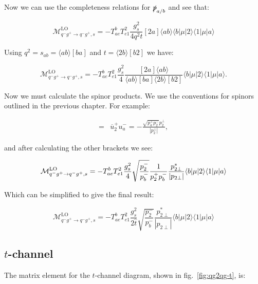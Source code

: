 			Now we can use the completeness relations for $\slashed p_{a/b}$ and see that:

			\begin{equation}
				\mathcal{M}_{q^-g^+\to q^-g^+, s}^{\text{LO}}=-T^b_{ae}T^2_{e1}\frac{g^2_s}{4q^2t}[2a]\langle ab\rangle\langle{b}|\mu|2\rangle\langle{1}|\mu|a\rangle
			\end{equation}

			Using $q^2=s_{ab}=\langle ab\rangle[ba]$ and $t=\langle2b\rangle[b2]$ we have:

			\begin{equation}
			\mathcal{M}_{q^-g^+\to q^-g^+, s}^{\text{LO}}=-T^b_{ae}T^2_{e1}\frac{g^2_s}{4}\frac{[2a]\langle ab\rangle}{\langle ab\rangle[ba]
			\langle2b\rangle[b2]}\langle{b}|\mu|2\rangle\langle{1}|\mu|a\rangle.
			\end{equation}

			Now we must calculate the spinor products.  We use the conventions for spinors outlined in the
			previous chapter.  For example:

			\begin{align}
				[2a] = &\overline{u}^+_2u^-_a=-\frac{\sqrt{p_a^+p_2^-}p_2^\perp}{|p_2^\perp|},
			\end{align}

			and after calculating the other brackets we see:

			\begin{equation}
				\mathcal{M}_{q^-g^+\to q^-g^+, s}^{\text{LO}} = -T^b_{ae}T^2_{e1}\frac{g_s^2}{4}\sqrt{\frac{p_2^-}{p_b^-}}\frac{1}{p_2^+p_b^-} \frac{p_{2\perp}^*}{|p_{2\perp}|} \langle b | \mu | 2 \rangle \langle 1 | \mu | a \rangle
			\end{equation}

			Which can be simplified to give the final result:

			\begin{equation}
				\mathcal{M}_{q^-g^+\to q^-g^+, s}^{\text{LO}}=-T^b_{ae}T^2_{e1}\frac{g_s^2}{2\hat{t}}\sqrt{\frac{p_2^-}{p_b^-}}\frac{p_{2\perp}^*}
				{|p_{2\perp}|}\langle{b}|\mu|2\rangle\langle{1}|\mu|a\rangle
				\label{eqn:s-channel}
			\end{equation}

		\subsection{$t$-channel}

			The matrix element for the $t$-channel diagram, shown in fig.~\eqref{fig:qg2qg-t}, is:

